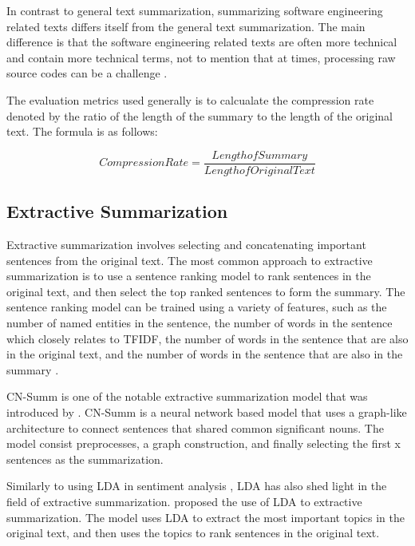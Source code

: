 In contrast to general text summarization, summarizing software engineering related texts differs itself from the general text summarization. The main difference is that the software engineering related texts are often more technical and contain more technical terms, not to mention that at times, processing raw source codes can be a challenge \cite{8449647}.

The evaluation metrics used generally is to calcualate the compression rate denoted by the ratio of the length of the summary to the length of the original text.\cite{ATSMACR2022} The formula is as follows:
 
\[ Compression Rate = \frac{Length of Summary}{Length of Original Text} \]

\pagebreak
\subsection{Extractive Summarization}

Extractive summarization involves selecting and concatenating important sentences from the original text. The most common approach to extractive summarization is to use a sentence ranking model to rank sentences in the original text, and then select the top ranked sentences to form the summary. The sentence ranking model can be trained using a variety of features, such as the number of named entities in the sentence, the number of words in the sentence which closely relates to TFIDF, the number of words in the sentence that are also in the original text, and the number of words in the sentence that are also in the summary \cite{ATSMACR2022}.

CN-Summ is one of the notable extractive summarization model that was introduced by \cite{ACNATTS2009}. CN-Summ is a neural network based model that uses a graph-like architecture to connect sentences that shared common significant nouns. The model consist preprocesses, a graph construction, and finally selecting the first x sentences as the summarization.

Similarly to using LDA in sentiment analysis \cite{SOABSAUMLT2021}, LDA has also shed light in the field of extractive summarization. \cite{ATSULSA2011} proposed the use of LDA to extractive summarization. The model uses LDA to extract the most important topics in the original text, and then uses the topics to rank sentences in the original text. 
\pagebreak

